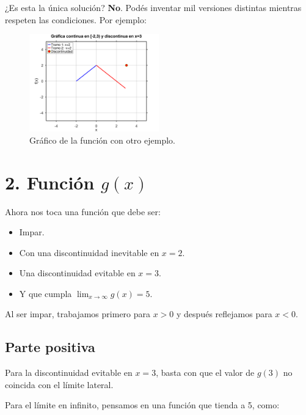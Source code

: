 \documentclass[12pt]{article}
\let\oldincludegraphics\includegraphics
\renewcommand{\includegraphics}[2][]{%
  \oldincludegraphics[width=0.5\textwidth,#1]{#2}%
}
\begin{document}
¿Es esta la única solución? \textbf{No}.  
Podés inventar mil versiones distintas mientras respeten las condiciones. Por ejemplo:

\begin{figure}[H]
  \centering
  \includegraphics{img/ej001otro-ejemplo.png}
  \caption{Gráfico de la función con otro ejemplo.}
\end{figure}

\section*{2. Función $g(x)$}
Ahora nos toca una función que debe ser:
\begin{itemize}
  \item Impar.
  \item Con una discontinuidad inevitable en $x=2$.
  \item Una discontinuidad evitable en $x=3$.
  \item Y que cumpla $\lim_{x \to \infty} g(x) = 5$.
\end{itemize}
Al ser impar, trabajamos primero para $x>0$ y después reflejamos para $x<0$.

\subsection*{Parte positiva}
Para la discontinuidad evitable en $x=3$, basta con que el valor de $g(3)$ no coincida con el límite lateral.

Para el límite en infinito, pensamos en una función que tienda a 5, como:
\end{document}
